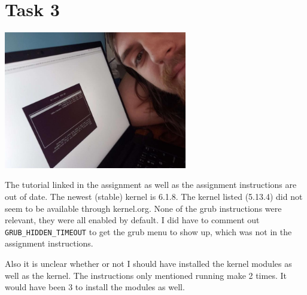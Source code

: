 \documentclass[11pt]{article}
\begin{document}
\section*{Task 3}
\label{sec:org25937a1}
\begin{center}
\includegraphics[width=8cm]{grub2.jpg}
\end{center}
The tutorial linked in the assignment as well as the assignment instructions are
out of date. The newest (stable) kernel is 6.1.8. The kernel listed (5.13.4) did
not seem to be available through kernel.org. None of the grub instructions were
relevant, they were all enabled by default. I did have to comment out
\texttt{GRUB\_HIDDEN\_TIMEOUT} to get the grub menu to show up, which was not in the
assignment instructions.

Also it is unclear whether or not I should have installed the kernel modules as
well as the kernel. The instructions only mentioned running make 2 times. It
would have been 3 to install the modules as well.
\end{document}

